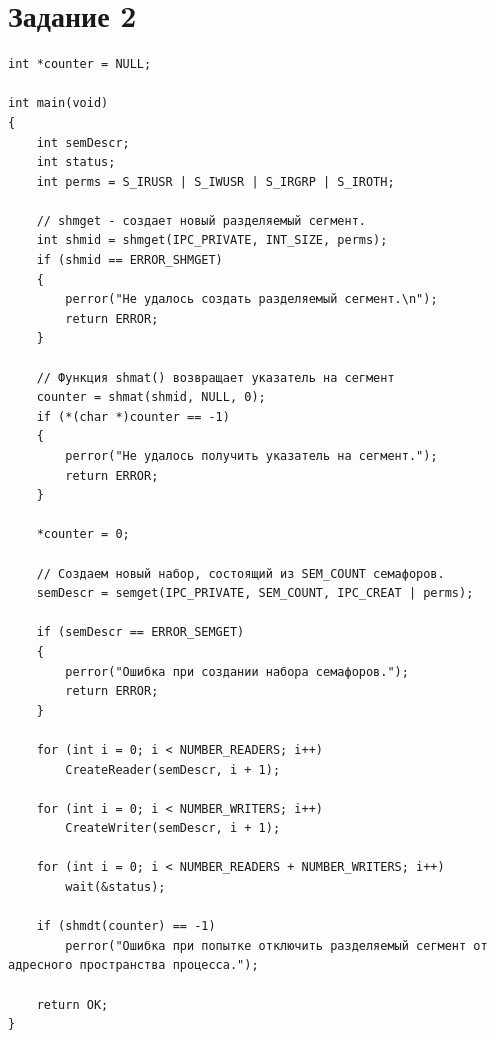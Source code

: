 \section{Задание 2}

\begin{lstlisting}[label=some-code,caption=Главный файл main]
int *counter = NULL;

int main(void)
{
	int semDescr;
	int status;
	int perms = S_IRUSR | S_IWUSR | S_IRGRP | S_IROTH;

	// shmget - создает новый разделяемый сегмент.
	int shmid = shmget(IPC_PRIVATE, INT_SIZE, perms);
	if (shmid == ERROR_SHMGET)
	{
		perror("Не удалось создать разделяемый сегмент.\n");
		return ERROR;
	}

	// Функция shmat() возвращает указатель на сегмент
	counter = shmat(shmid, NULL, 0);
	if (*(char *)counter == -1)
	{
		perror("Не удалось получить указатель на сегмент.");
		return ERROR;
	}

	*counter = 0;

	// Создаем новый набор, состоящий из SEM_COUNT семафоров.
	semDescr = semget(IPC_PRIVATE, SEM_COUNT, IPC_CREAT | perms);

	if (semDescr == ERROR_SEMGET)
	{
		perror("Ошибка при создании набора семафоров.");
		return ERROR;
	}

	for (int i = 0; i < NUMBER_READERS; i++)
		CreateReader(semDescr, i + 1);

	for (int i = 0; i < NUMBER_WRITERS; i++)
		CreateWriter(semDescr, i + 1);

	for (int i = 0; i < NUMBER_READERS + NUMBER_WRITERS; i++)
		wait(&status);

	if (shmdt(counter) == -1)
		perror("Ошибка при попытке отключить разделяемый сегмент от адресного пространства процесса.");

	return OK;
}
\end{lstlisting}


